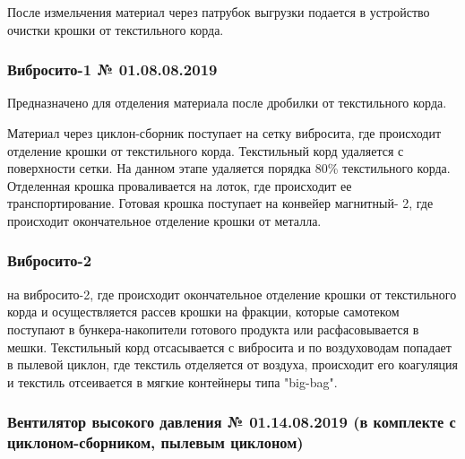 	
	
После измельчения материал через патрубок выгрузки подается в устройство очистки крошки от текстильного корда.


\subsubsection{Вибросито-1 № 01.08.08.2019}

Предназначено для  отделения материала после дробилки от  текстильного корда.

Материал через циклон-сборник поступает на сетку вибросита, где происходит отделение крошки от текстильного корда. Текстильный корд удаляется с поверхности сетки. На данном этапе удаляется порядка 80\% текстильного корда. Отделенная крошка проваливается на лоток, где происходит ее транспортирование. Готовая крошка поступает на конвейер магнитный- 2, где происходит окончательное отделение крошки от металла.


\vspace{10mm}





\subsubsection{Вибросито-2}

\vspace{10mm}


на вибросито-2, где происходит окончательное отделение крошки от текстильного корда и осуществляется рассев крошки на фракции, которые самотеком поступают в бункера-накопители готового продукта или расфасовывается в мешки.
Текстильный корд отсасывается с вибросита и по воздуховодам попадает в пылевой циклон, где текстиль отделяется от воздуха, происходит его коагуляция и текстиль отсеивается в мягкие контейнеры типа "big-bag".


\subsubsection{Вентилятор 	высокого давления № 01.14.08.2019	(в комплекте с циклоном-сборником, пылевым циклоном)
}

\vspace{10mm}

